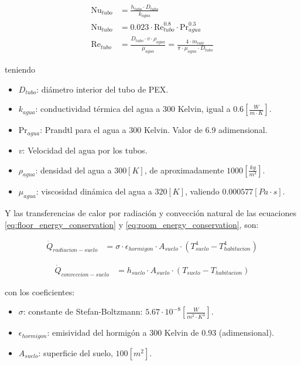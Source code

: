 \begin{align}
	\text{Nu}_{tubo} & = \frac{h_{tubo} \cdot D_{tubo}}{k_{agua}}                                                                                   \\
	\text{Nu}_{tubo} & = 0.023 \cdot \text{Re}_{tubo}^{0.8} \cdot \text{Pr}_{agua}^{0.3}     \label{eq:dittus-boelter}                              \\
	\text{Re}_{tubo} & = \frac{D_{tubo} \cdot v \cdot \rho_{agua}}{\mu_{agua}} = \frac{4 \cdot \dot{m}_{cale}}{\pi \cdot \mu_{agua} \cdot D_{tubo}}
\end{align}

teniendo

\begin{itemize}
	\item $D_{tubo}$: diámetro interior del tubo de PEX.
	\item $k_{agua}$: conductividad térmica del agua a 300 Kelvin, igual a $0.6\left[\frac{W}{m \cdot K}\right]$.
	\item $\text{Pr}_{agua}$: Prandtl para el agua a 300 Kelvin. Valor de 6.9 adimensional.
	\item $v$: Velocidad del agua por los tubos.
	\item $\rho_{agua}$: densidad del agua a $300[K]$, de aproximadamente $1000\left[\frac{kg}{m^3}\right]$.
	\item $\mu_{agua}$: viscosidad dinámica del agua a $320[K]$, valiendo $0.000577[Pa \cdot s]$.
\end{itemize}


Y las transferencias de calor por radiación y convección natural de las
ecuaciones \eqref{eq:floor_energy_conservation} y
\eqref{eq:room_energy_conservation}, son:

\begin{align}
	\dot{Q}_{radiacion-suelo} & =  \sigma \cdot \epsilon_{hormigon} \cdot A_{suelo} \cdot (T_{suelo}^4 - T_{habitacion}^4)
\end{align}

\begin{align}
	\dot{Q}_{conveccion-suelo} & = h_{suelo} \cdot A_{suelo} \cdot (T_{suelo} - T_{habitacion})
\end{align}

con los coeficientes:

\begin{itemize}
	\item $\sigma$: constante de Stefan-Boltzmann: $5.67\cdot 10^{-8} \left[\frac{W}{m^2 \cdot K^4}\right]$.
	\item $\epsilon_{hormigon}$: emisividad del hormigón a 300 Kelvin de 0.93 (adimensional).
	\item $A_{suelo}$: superficie del suelo, $100[m^2]$.
\end{itemize}

